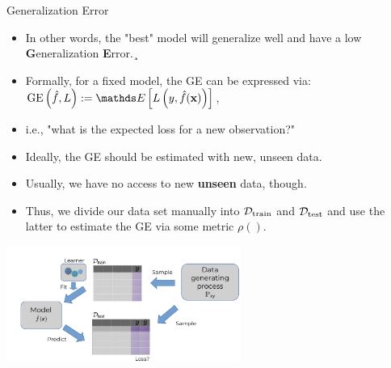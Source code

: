 \documentclass[11pt,compress,t,notes=noshow, xcolor=table]{beamer}
\begin{document}
\begin{vbframe}{Generalization Error}

\begin{itemize}
\item In other words, the "best" model will generalize well and have a low \textbf{G}eneralization \textbf{E}rror.¸
\item Formally, for a fixed model, the GE can be expressed via: $\GEfL := \E \left[ \Lyfhx \right]$,
\item i.e., "what is the expected loss for a new observation?"
\item Ideally, the GE should be estimated with new, unseen data.
\item Usually, we have no access to new \textbf{unseen} data, though.
\item Thus, we divide our data set manually into $\mathcal{D}_{\text{train}}$ and $\mathcal{D}_{\text{test}}$ and use the latter to estimate the GE via some metric $\rho()$.
\end{itemize}

\begin{center}
\includegraphics[trim = 0 0 0 30, clip, width=0.575\textwidth]
{figure_man/evaluation-intro-ge.pdf}
\end{center}

\end{vbframe}
\end{document}
